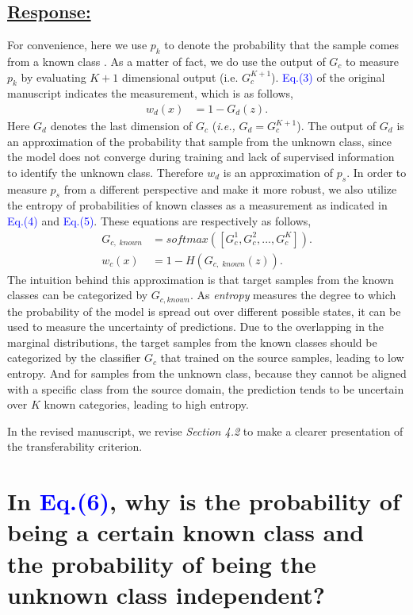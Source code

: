 \subsection*{\underline{\textbf{Response:}}}

For convenience, here we use $p_k$ to denote the probability that the sample comes from a known class . 
As a matter of fact, we do use the output of $G_c$ to measure $p_k$ by evaluating $K+1$ dimensional output (i.e. $G_c^{K+1}$). 
\textcolor{blue}{Eq.(3)} of the original manuscript indicates the measurement, which is as follows, 
\begin{align}
    w_d(x) &= 1-G_d(z). \label{eq: domain transferability}
\end{align}
Here $G_d$ denotes the last dimension of $G_c$ (\textit{i.e.,} $G_d = G_c^{K+1}$). 
The output of $G_d$ is an approximation of the probability that sample from the unknown class, since the model does not converge during training and lack of supervised information to identify the unknown class.
Therefore $w_d$ is an approximation of $p_s$.
In order to measure $p_s$ from a different perspective and make it more robust, we also utilize the entropy of probabilities of known classes as a measurement as indicated in \textcolor{blue}{Eq.(4)} and \textcolor{blue}{Eq.(5)}.
These equations are respectively as follows,
\begin{align}
    G_{c,\; known} &= softmax([G_c^1,G_c^2,...,G_c^K]).\\
    w_c(x) &= 1-H(G_{c,\; known}(z)). \label{eq: class transferability}
\end{align}
The intuition behind this approximation is that target samples from the known classes can be categorized by $G_{c, known}$.
As \textit{entropy} measures the degree to which the probability of the model is spread out over different possible states, it can be used to measure the uncertainty of predictions.
Due to the overlapping in the marginal distributions, the target samples from the known classes should be categorized by the classifier $G_c$ that trained on the source samples, leading to low entropy.
And for samples from the unknown class, because they cannot be aligned with a specific class from the source domain, the prediction tends to be uncertain over $K$ known categories, leading to high entropy.

In the revised manuscript, we revise \textit{Section 4.2 } to make a clearer presentation of the transferability criterion. 


\section{In \textcolor{blue}{Eq.(6)}, why is the probability of being a certain known class and the probability of being the unknown class independent? }
